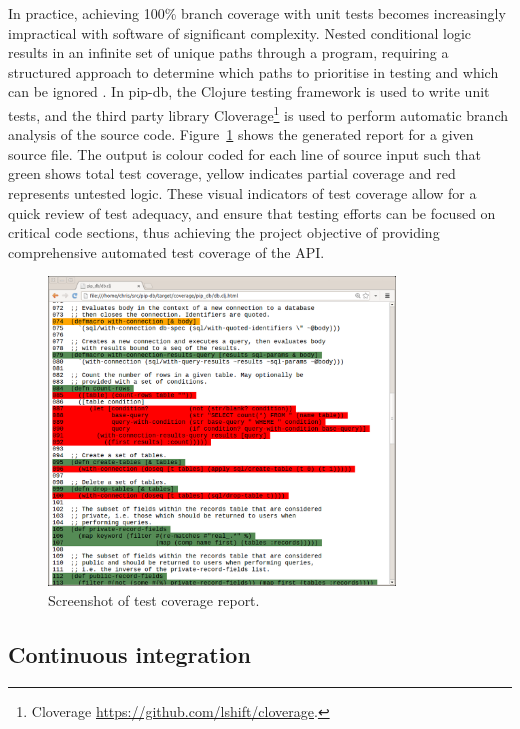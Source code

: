 In practice, achieving 100\% branch coverage with unit tests becomes
increasingly impractical with software of significant
complexity. Nested conditional logic results in an infinite set of
unique paths through a program, requiring a structured approach to
determine which paths to prioritise in testing and which can be
ignored \cite{woodward1980experience}. In pip-db, the Clojure testing
framework is used to write unit tests, and the third party library
Cloverage\footnote{Cloverage
  \url{https://github.com/lshift/cloverage}.} is used to perform
automatic branch analysis of the source
code. Figure~\ref{fig:cloverage} shows the generated report for a
given source file. The output is colour coded for each line of source
input such that green shows total test coverage, yellow indicates
partial coverage and red represents untested logic. These visual
indicators of test coverage allow for a quick review of test adequacy,
and ensure that testing efforts can be focused on critical code
sections, thus achieving the project objective of providing
comprehensive automated test coverage of the API.


\begin{figure}[H]
\centering
    \includegraphics[width=0.82\textwidth]{assets/cloverage}
\caption[Screenshot of test coverage report]
        {Screenshot of test coverage report.}
\label{fig:cloverage}
\end{figure}


\newpage
\subsection{Continuous integration}\label{subsec:ci}

